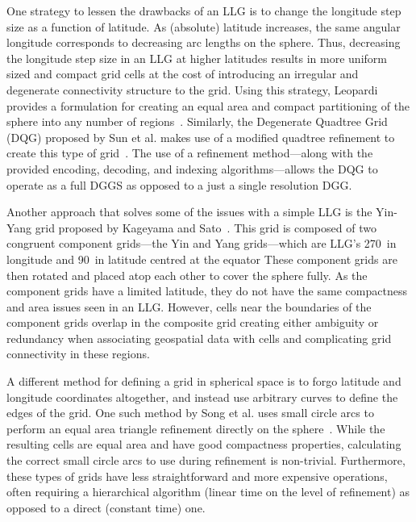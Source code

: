 One strategy to lessen the drawbacks of an LLG is to change the longitude step size as a function of latitude. As (absolute) latitude increases, the same angular longitude corresponds to decreasing arc lengths on the sphere.
Thus, decreasing the longitude step size in an LLG at higher latitudes results in more uniform sized and compact grid cells at the cost of introducing an irregular and degenerate connectivity structure to the grid.
Using this strategy, Leopardi provides a formulation for creating an equal area and compact partitioning of the sphere into any number of regions~\cite{leopardi2006partition}.
Similarly, the Degenerate Quadtree Grid (DQG) proposed by Sun et al. makes use of a modified quadtree refinement to create this type of grid~\cite{sun2008global}.
The use of a refinement method---along with the provided encoding, decoding, and indexing algorithms---allows the DQG to operate as a full DGGS as opposed to a just a single resolution DGG.


Another approach that solves some of the issues with a simple LLG is the Yin-Yang grid proposed by Kageyama and Sato~\cite{kageyama2004yin-yang}.
This grid is composed of two congruent component grids---the Yin and Yang grids---which are LLG's 270\textdegree \ in longitude and 90\textdegree \ in latitude centred at the equator
These component grids are then rotated and placed atop each other to cover the sphere fully.
As the component grids have a limited latitude, they do not have the same compactness and area issues seen in an LLG.
However, cells near the boundaries of the component grids overlap in the composite grid creating either ambiguity or redundancy when associating geospatial data with cells and complicating grid connectivity in these regions.


A different method for defining a grid in spherical space is to forgo latitude and longitude coordinates altogether, and instead use arbitrary curves to define the edges of the grid.
One such method by Song et al. uses small circle arcs to perform an equal area triangle refinement directly on the sphere~\cite{song2002developing}.
While the resulting cells are equal area and have good compactness properties, calculating the correct small circle arcs to use during refinement is non-trivial.
Furthermore, these types of grids have less straightforward and more expensive operations, often requiring a hierarchical algorithm (linear time on the level of refinement) as opposed to a direct (constant time) one.


